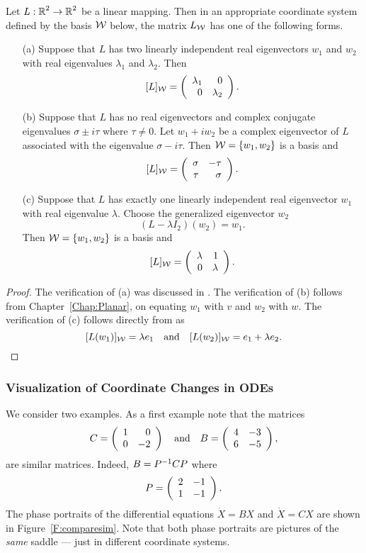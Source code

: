 \documentclass{ximera}
\begin{document}
\begin{theorem}  \label{T:putinform2}
Let $L:\mbox{$\Bbb{R}$}^2\to\mbox{$\Bbb{R}$}^2$ be a linear mapping.  Then in an appropriate
coordinate system defined by the basis ${\cal W}$ below, the matrix
$L_{\cal W}$ has one of the following forms.
\begin{itemize}
\item[(a)]	Suppose that $L$ has two linearly independent
real eigenvectors $w_1$ and $w_2$ with real eigenvalues $\lambda_1$
and $\lambda_2$.  Then
\[
[L]_{\cal W} = \left(\begin{array}{rr} \lambda_1 & 0\\ 0 &\lambda_2\end{array}\right).
\]

\item[(b)]	Suppose that $L$ has no real eigenvectors and
complex conjugate eigenvalues $\sigma\pm i\tau$ where
$\tau\neq 0$.  Let $w_1+iw_2$ be a complex eigenvector of $L$
associated with the eigenvalue $\sigma-i\tau$.
Then ${\cal W}=\{w_1,w_2\}$ is a basis and
\[
[L]_{\cal W} = \left(\begin{array}{rr} \sigma & -\tau\\ \tau &\sigma\end{array}\right).
\]

\item[(c)]	Suppose that $L$ has exactly one linearly
independent real eigenvector $w_1$ with real eigenvalue $\lambda$.
Choose the generalized eigenvector $w_2$
\begin{equation}  \label{e:Lw=lw+v}
(L-\lambda I_2)(w_2) =  w_1.
\end{equation}
Then ${\cal W}=\{w_1,w_2\}$ is a basis and
\[
[L]_{\cal W} = \left(\begin{array}{rr} \lambda & 1\\ 0 &\lambda\end{array}\right).
\]
\end{itemize}
\end{theorem}

\begin{proof}
The verification of (a) was discussed in .  The
verification of (b) follows from Chapter~\ref{Chap:Planar},
 on equating $w_1$ with $v$ and $w_2$ with $w$.
The verification of (c) follows directly from  as
\[
[L(w_1)]_{\cal W} = \lambda e_1 \quad\mbox{and}\quad [L(w_2)]_{\cal W} = e_1+\lambda e_2.
\]
\end{proof}



\subsubsection*{Visualization of Coordinate Changes in ODEs}

We consider two examples.  As a first example note that the matrices
\[
C = \left(\begin{array}{rr} 1 & 0\\ 0 &-2\end{array}\right) \quad\mbox{and}\quad B = \left(\begin{array}{rr} 4 & -3\\ 6 &-5\end{array}\right),
\]
are similar matrices.   Indeed, $B = P^{-1} CP$ where
\begin{equation}  \label{e:Pchange}
P = \left(\begin{array}{rr} 2 & -1\\ 1 &-1\end{array}\right).
\end{equation}
The phase portraits of the differential equations $\dot{X}=BX$ and
$\dot{X}=CX$ are shown in Figure~\ref{F:comparesim}.  Note that both
phase portraits are pictures of the {\em same\/} saddle ---
just in different coordinate systems.
\end{document}
